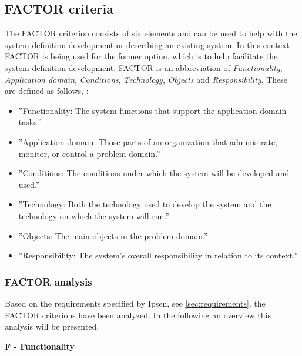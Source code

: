 \subsection{FACTOR criteria} \label{sec:factorcriteria}
The FACTOR criterion consists of six elements and can be used to help with the system definition development or describing an existing system.
In this context FACTOR is being used for the former option, which is to help facilitate the system definition development.
FACTOR is an abbreviation of \textit{Functionality}, \textit{Application domain}, \textit{Conditions}, \textit{Technology}, \textit{Objects} and \textit{Responsibility}.
These are defined as follows, \citep[p.~40]{Rod-Aalborg}:
\begin{itemize}
	\item
		''Functionality:
		The system functions that support the application-domain tasks.''
	\item
		''Application domain:
		Those parts of an organization that administrate, monitor, or control a problem domain.''
	\item
		''Conditions:
		The conditions under which the system will be developed and used.''
	\item
		''Technology:
		Both the technology used to develop the system and the technology on which the system will run.''
	\item
		''Objects:
		The main objects in the problem domain.''
	\item
		''Responsibility:
		The system’s overall responsibility in relation to its context.''
\end{itemize}

\subsubsection{FACTOR analysis}\label{factor}

Based on the requirements specified by Ipsen, see \cref{sec:requirements}, the FACTOR criterions have been analyzed.
In the following an overview this analysis will be presented.

\noindent\textbf{F - Functionality}

